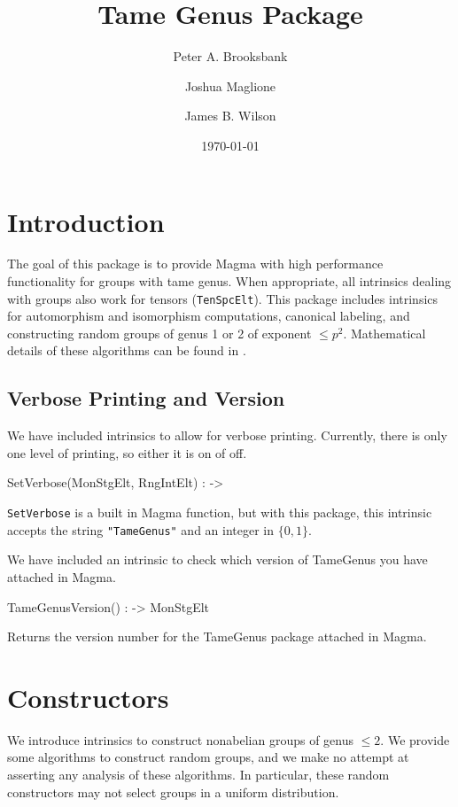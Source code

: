 \documentclass{documentation}
\title{Tame Genus Package}
\author{Peter A. Brooksbank}
\author{Joshua Maglione}
\author{James B. Wilson}
\date{\today}
\begin{document}
\frontmatter

\maketitle
\tableofcontents

\mainmatter

\chapter{Introduction}

The goal of this package is to provide {\sc Magma} \cite{Magma} with high performance functionality for groups with tame genus. 
When appropriate, all intrinsics dealing with groups also work for tensors ({\tt TenSpcElt}). 
This package includes intrinsics for automorphism and isomorphism computations, canonical labeling, and constructing random groups of genus 1 or 2 of exponent  $\leq p^2$. 
Mathematical details of these algorithms can be found in \cite{BMW}.

\section{Verbose Printing and Version}

We have included intrinsics to allow for verbose printing. 
Currently, there is only one level of printing, so either it is on of off. 

\begin{intrinsics}
SetVerbose(MonStgElt, RngIntElt) : -> 
\end{intrinsics}

{\tt SetVerbose} is a built in Magma function, but with this package, this intrinsic accepts the string {\tt "TameGenus"} and an integer in $\{0,1\}$. 

We have included an intrinsic to check which version of TameGenus you have attached in Magma.

\begin{intrinsics}
TameGenusVersion() : -> MonStgElt
\end{intrinsics}

Returns the version number for the TameGenus package attached in Magma.


\chapter{Constructors}

We introduce intrinsics to construct nonabelian groups of genus $\leq 2$. 
We provide some algorithms to construct random groups, and we make no attempt at asserting any analysis of these algorithms.
In particular, these random constructors may not select groups in a uniform distribution. 
\end{document}
